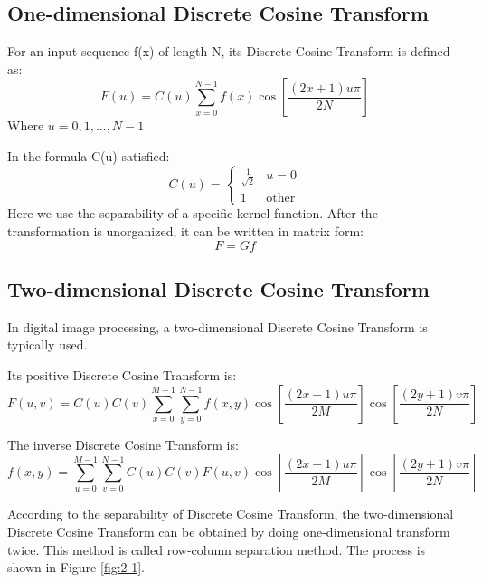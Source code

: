 \subsection{One-dimensional Discrete Cosine Transform}

For an input sequence f(x) of length N, its Discrete Cosine Transform is defined as:
\begin{equation}
F(u) = C(u) \sum_{x=0}^{N-1} f(x) \cos \left[ \frac{(2x+1)u\pi}{2N} \right]
\label{eq:2-14}
\end{equation}
Where $u=0,1,...,N-1$

In the formula C(u) satisfied:
\begin{equation}
C(u) = \begin{cases} \frac{1}{\sqrt{2}} & u = 0 \\ 1 & \mathrm{other} \end{cases}
\label{eq:2-15}
\end{equation}
Here we use the separability of a specific kernel function. After the transformation is unorganized, it can be written in matrix form: 
\begin{equation}
F = Gf
\label{eq:2-16}
\end{equation}

\subsection{Two-dimensional Discrete Cosine Transform }

In digital image processing, a two-dimensional Discrete Cosine Transform is typically used.

Its positive Discrete Cosine Transform is:
\begin{equation}
F(u,v) = C(u)C(v) \sum_{x=0}^{M-1} \sum_{y=0}^{N-1} f(x,y) \cos \left[ \frac{(2x+1)u\pi}{2M} \right] \cos \left[ \frac{(2y+1)v\pi}{2N} \right]
\label{eq:2-17}
\end{equation}

The inverse Discrete Cosine Transform is:
\begin{equation}
f(x,y) = \sum_{u=0}^{M-1} \sum_{v=0}^{N-1} C(u)C(v) F(u,v) \cos \left[ \frac{(2x+1)u\pi}{2M} \right] \cos \left[ \frac{(2y+1)v\pi}{2N} \right]
\label{eq:2-18}
\end{equation}

According to the separability of Discrete Cosine Transform, the two-dimensional Discrete Cosine Transform can be obtained by doing one-dimensional transform twice. This method is called row-column separation method. The process is shown in Figure \ref{fig:2-1}.

